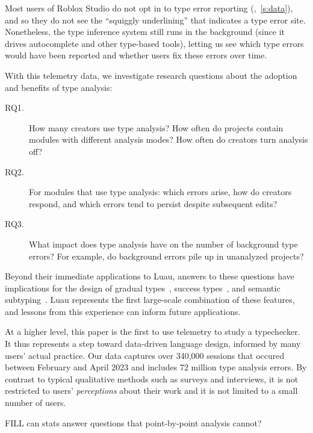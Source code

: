 \documentclass[english,submission,cleveref]{programming}
\begin{document}
Most users of {Roblox Studio} do not opt in to type error
reporting (,~\cref{s:data}), and so they do not see the ``squiggly underlining'' that
indicates a type error site. Nonetheless, the type inference system
still runs in the background (since it drives autocomplete and other
type-based tools), letting us see which type errors would have
been reported and whether users fix these errors over time.

With this telemetry data, we investigate research questions about
the adoption and benefits of type analysis:
\begin{description}
  \item[RQ1.]
    How many creators use type analysis?
    How often do projects contain modules with different
    analysis modes?
    How often do creators turn analysis off?
  \item[RQ2.]
    For modules that use type analysis:
    which errors arise,
    how do creators respond,
    and which errors tend to persist despite subsequent edits?
  \item[RQ3.]
    What impact does type analysis have on the number of background type
    errors?
    For example, do background errors pile up in unanalyzed projects?
\end{description}

Beyond their immediate applications to {Luau},
answers to these questions have implications for the design
of gradual types~\cite{st-sfp-2006}, success types~\cite{lindahl2006practical},
and semantic subtyping~\cite{CF05:GentleIntroduction,Jef22:SemanticSubtyping}.
Luau represents the first large-scale combination of these features,
and lessons from this experience can inform future applications.

At a higher level, this paper is the first to use telemetry 
to study a typechecker.
It thus represents a step toward data-driven language design,
informed by many users' actual practice.
Our data captures over 340,000 sessions
that occured between February and April 2023
and includes 72 million type analysis errors.
By contrast to typical qualitative methods such as surveys and interviews, it
is not restricted to users' \emph{perceptions} about their work and it is not
limited to a small number of users.

FILL can stats answer questions that point-by-point analysis cannot?
\end{document}
